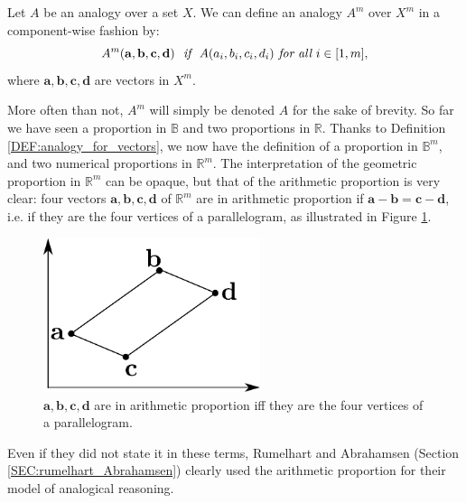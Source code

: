 \begin{definition}
  \label{DEF:analogy_for_vectors}
  Let $A$ be an analogy over a set $X$. We can define an analogy $A^m$
  over $X^m$ in a component-wise fashion by:
  $$A^m(\mathbf{a}, \mathbf{b}, \mathbf{c}, \mathbf{d}) ~ \emph{  if  } ~
  A(a_i, b_i, c_i, d_i) \emph{ for all } i \in [1, m],$$
  where $\mathbf{a}, \mathbf{b}, \mathbf{c}, \mathbf{d}$ are vectors in $X^m$.
\end{definition}
\noindent
More often than not, $A^m$ will simply be denoted $A$ for the sake of brevity.
So far we have seen a proportion in $\mathbb{B}$ and two proportions in
$\mathbb{R}$. Thanks to Definition \ref{DEF:analogy_for_vectors}, we now have
the definition of a proportion in $\mathbb{B}^m$, and two numerical proportions
in $\mathbb{R}^m$. The interpretation of the geometric proportion in
$\mathbb{R}^m$ can be opaque, but that of the arithmetic proportion is very
clear: four vectors $\mathbf{a}, \mathbf{b}, \mathbf{c}, \mathbf{d}$ of
$\mathbb{R}^m$ are in arithmetic proportion if $\mathbf{a} - \mathbf{b} =
\mathbf{c} - \mathbf{d}$, i.e. if they are the four vertices of a
parallelogram, as illustrated in Figure \ref{FIG:arithmetic_proportion}.

\begin{figure}[!h]
\centering
  \includegraphics[width=2.5in]{figures/arithmetic_proportion.pdf}
  \caption{$\mathbf{a}, \mathbf{b}, \mathbf{c}, \mathbf{d}$
  are in arithmetic proportion iff they are the four vertices of a
  parallelogram.}
\label{FIG:arithmetic_proportion}
\end{figure}

Even if they did not state it in these terms, Rumelhart and Abrahamsen (Section
\ref{SEC:rumelhart_Abrahamsen}) clearly used the arithmetic proportion for their model of
analogical reasoning.

